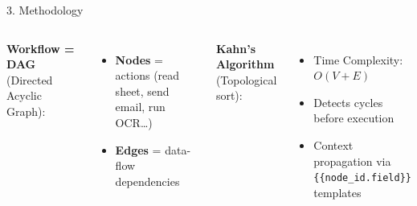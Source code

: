 \documentclass[10pt,aspectratio=169]{beamer}
\begin{document}
\begin{frame}[fragile]{3. Methodology}
\begin{columns}
        \small
        \textbf{Workflow = DAG} (Directed Acyclic Graph):
        \begin{itemize}
            \item \textbf{Nodes} = actions (read sheet, send email, run OCR\ldots)
            \item \textbf{Edges} = data-flow dependencies
        \end{itemize}
        \vspace{0.2cm}
        \textbf{Kahn's Algorithm} (Topological sort):
        \begin{itemize}
            \item Time Complexity: $O(V+E)$
            \item Detects cycles before execution
            \item Context propagation via \texttt{\{\{node\_id.field\}\}} templates
        \end{itemize}
    \end{columns}
\end{frame}

\end{document}
